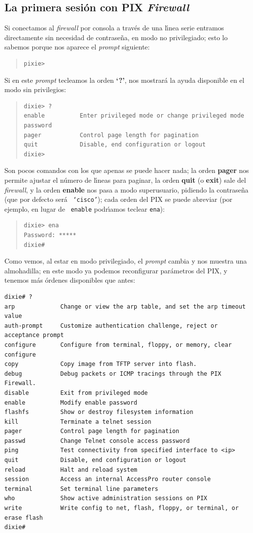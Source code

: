 \subsection{La primera sesi\'on con PIX {\it Firewall}} 
Si conectamos al {\it firewall} por consola a trav\'es de una l\'{\i}nea serie
entramos directamente sin necesidad de contrase\~na, en modo no privilegiado; 
esto lo sabemos porque nos aparece el {\it prompt} siguiente:
\begin{quote}
\begin{verbatim}
pixie>
\end{verbatim}
\end{quote}
Si en este {\it prompt} tecleamos la orden {\bf `?'}, nos mostrar\'a la ayuda 
disponible en el modo sin privilegios:
\begin{quote}
\begin{verbatim}
dixie> ?
enable          Enter privileged mode or change privileged mode password
pager           Control page length for pagination
quit            Disable, end configuration or logout
dixie>
\end{verbatim}
\end{quote}
Son pocos comandos con los que apenas se puede hacer nada; la orden {\bf pager} 
nos permite ajustar el n\'umero de l\'{\i}neas para paginar, la orden {\bf 
quit} (o {\bf exit}) sale del {\it firewall}, y la orden {\bf enable} nos pasa 
a modo superusuario, pidiendo la contrase\~na (que por defecto ser\'a {\tt 
`cisco'}); cada orden del PIX se puede abreviar (por ejemplo, en lugar de {\tt 
enable} podr\'{\i}amos teclear {\tt ena}):
\begin{quote}
\begin{verbatim}
dixie> ena
Password: *****
dixie#
\end{verbatim}
\end{quote}
Como vemos, al estar en modo privilegiado, el {\it prompt} cambia y nos muestra 
una almohadilla; en este modo ya podemos reconfigurar par\'ametros del PIX, y 
tenemos m\'as \'ordenes disponibles que antes:
\begin{verbatim}
dixie# ?
arp             Change or view the arp table, and set the arp timeout value
auth-prompt     Customize authentication challenge, reject or acceptance prompt
configure       Configure from terminal, floppy, or memory, clear configure
copy            Copy image from TFTP server into flash.
debug           Debug packets or ICMP tracings through the PIX Firewall.
disable         Exit from privileged mode
enable          Modify enable password
flashfs         Show or destroy filesystem information
kill            Terminate a telnet session
pager           Control page length for pagination
passwd          Change Telnet console access password
ping            Test connectivity from specified interface to <ip>
quit            Disable, end configuration or logout
reload          Halt and reload system
session         Access an internal AccessPro router console
terminal        Set terminal line parameters
who             Show active administration sessions on PIX
write           Write config to net, flash, floppy, or terminal, or erase flash
dixie#
\end{verbatim}
